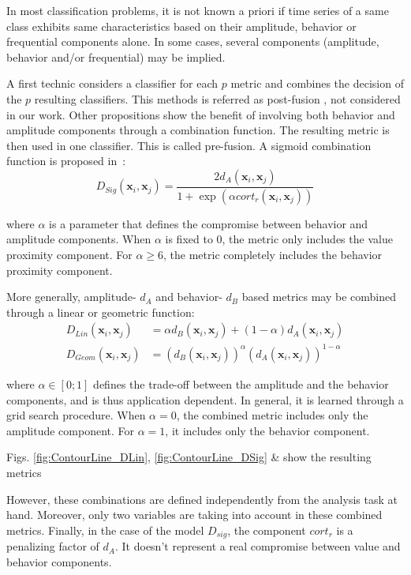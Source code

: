 In most classification problems, it is not known a priori if time series of a same class exhibits same characteristics based on their amplitude,  behavior or frequential components alone. In some cases, several components (amplitude, behavior and/or frequential) may be implied. 

A first technic considers a classifier for each $p$ metric and combines the decision of the $p$ resulting classifiers. This methods is referred as post-fusion , not considered in our work. Other propositions show the benefit of involving both behavior and amplitude components through a combination function. The resulting metric is then used in one classifier. This is called pre-fusion. A sigmoid combination function is proposed in~\cite{AhlameDouzal-Chouakria2011}:
\begin{equation}	
	D_{Sig}(\textbf{x}_i,\textbf{x}_j) = \frac{2d_A(\textbf{x}_i,\textbf{x}_j)}{1+\exp(\alpha cort_r(\textbf{x}_i,\textbf{x}_j))}
	\label{eq:DSig}
\end{equation}

\noindent where $\alpha$ is a parameter that defines the compromise between behavior and amplitude components. When $\alpha$ is fixed to 0, the metric only includes the value proximity component. For $\alpha \geq 6$, the metric completely includes the behavior proximity component. 

\noindent More generally, amplitude- $d_A$ and behavior- $d_{B}$ based metrics may be combined through a linear or geometric function: 
\begin{align}
D_{Lin}(\textbf{x}_i,\textbf{x}_j) &= \alpha d_{B}(\textbf{x}_i,\textbf{x}_j) + (1-\alpha) d_A(\textbf{x}_i,\textbf{x}_j)  \label{eq:DLin}   \\
D_{Geom}(\textbf{x}_i,\textbf{x}_j) &= (d_{B}(\textbf{x}_i,\textbf{x}_j))^\alpha  (d_A(\textbf{x}_i,\textbf{x}_j))^{1-\alpha} \label{eq:DGeom}
\end{align}

\noindent where $\alpha \in [0;1]$ defines the trade-off between the amplitude and the behavior components, and is thus application dependent. In general, it is learned through a grid search procedure. When $\alpha=0$, the combined metric includes only the amplitude component. For $\alpha=1$, it includes only the behavior component. 

Figs. \ref{fig:ContourLine_DLin}, \ref{fig:ContourLine_DSig} \&  show the resulting metrics

However, these combinations are defined independently from the analysis task at hand. Moreover, only two variables are taking into account in these combined metrics. Finally, in the case of the model $D_{sig}$, the component $cort_r$ is a penalizing factor of $d_A$. It doesn't represent a real compromise between value and behavior components. 

